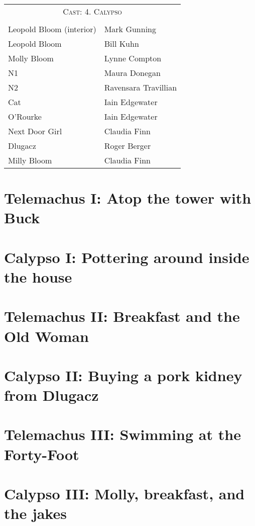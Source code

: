 \begin{tabular}{lp{10cm}}
    \multicolumn{2}{c}{\Large \textsc{Cast: 4. Calypso}} \\
\\
Leopold Bloom (interior) & Mark Gunning \\
Leopold Bloom & Bill Kuhn \\
Molly Bloom & Lynne Compton \\
N1 & Maura Donegan \\
N2 & Ravensara Travillian \\
Cat & Iain Edgewater \\
O'Rourke & Iain Edgewater \\
Next Door Girl & Claudia Finn \\
Dlugacz & Roger Berger \\
Milly Bloom & Claudia Finn \\
\end{tabular}
\thispagestyle{empty}

\newpage


\setcounter{page}{1}

\section*{Telemachus I: Atop the tower with Buck}


\section*{Calypso I: Pottering around inside the house}



\section*{Telemachus II: Breakfast and the Old Woman}


\section*{Calypso II: Buying a pork kidney from Dlugacz}



\section*{Telemachus III: Swimming at the Forty-Foot}


\section*{Calypso III: Molly, breakfast, and the jakes}



